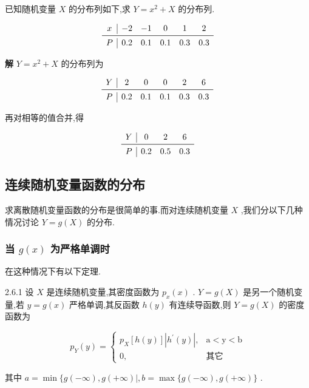 \begin{example}\label{exam:2.6.1}
	已知随机变量 $ X $ 的分布列如下,求 $ Y=x^{2}+X $ 的分布列.
	
	\[
	\begin{array}{c|ccccc}
	x & {-2} & {-1} & {0} & {1} & {2} \\ \midrule
	P & {0.2} & {0.1} & {0.1} & {0.3} & {0.3} \\ 
	\end{array}
	\]
	
	\textbf{解} $ Y=x^{2}+X $ 的分布列为
	
	\[
	\begin{array}{c|ccccc}
	Y & {2} & {0} & {0} & {2} & {6} \\ \midrule 
	P & {0.2} & {0.1} & {0.1} & {0.3} & {0.3}
	\end{array}
	\]
	
	再对相等的值合并,得
	
	\[
	\begin{array}{c|ccc}
	Y & {0} & {2} & {6} \\ \midrule 
	P & {0.2} & {0.5} & {0.3} \\
	\end{array}
	\]
	
\end{example}

\subsection{连续随机变量函数的分布}\label{ssec:2.6.2}

求离散随机变量函数的分布是很简单的事.而对连续随机变量 $ X $ ,我们分以下几种情况讨论 $ Y=g(X) $ 的分布.

\subsubsection{当 $ g(x) $ 为严格单调时}

在这种情况下有以下定理.

\begin{theorem}{}{2.6.1}
	设 $ X $ 是连续随机变量,其密度函数为 $ p_{x}(x) $ . $ Y=g(X) $ 是另一个随机变量,若 $ y=g(x) $ 严格单调,其反函数 $ h(y) $ 有连续导函数,则 $ Y=g(X) $ 的密度函数为
	
	\begin{equation}
	p_{Y}(y)=\left\{
	\begin{array}{ll}
	{p_{X}[h(y)]\left|h^{\prime}(y)\right|,} & { \mathrm{a}<\mathrm{y}<\mathrm{b}} \\ 
	{0,} & {\text{其它}}
	\end{array}\right. \label{eq:2.6.1}
	\end{equation}
	
	其中 $ a=\min \{g(-\infty), g(+\infty) |, b=\max \{g(-\infty), g(+\infty)\} $ .
\end{theorem}

